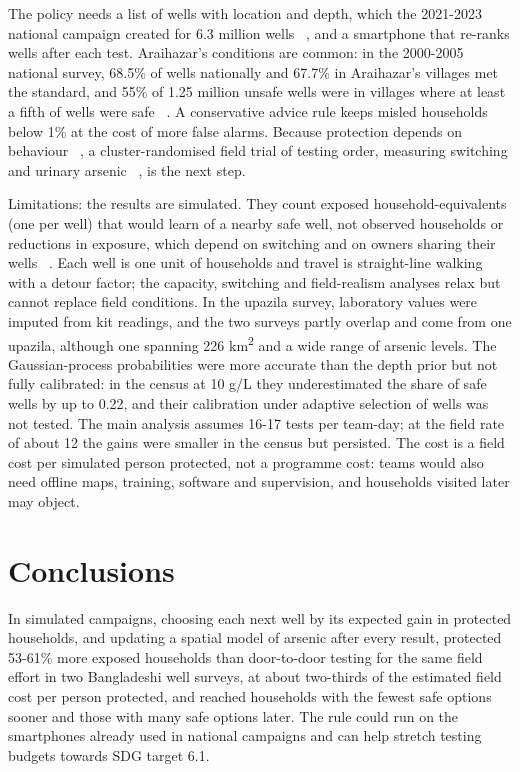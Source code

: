 \documentclass[sustainability,article,submit,pdftex,moreauthors]{Definitions/mdpi}
\begin{document}
The policy needs a list of wells with location and depth, which the 2021-2023 national campaign created for 6.3 million wells ~\cite{Khan2025}, and a smartphone that re-ranks wells after each test. Araihazar's conditions are common: in the 2000-2005 national survey, 68.5\% of wells nationally and 67.7\% in Araihazar's villages met the standard, and 55\% of 1.25 million unsafe wells were in villages where at least a fifth of wells were safe ~\cite{Jamil2019}. A conservative advice rule keeps misled households below 1\% at the cost of more false alarms. Because protection depends on behaviour ~\cite{Opar2007,Madajewicz2007,Pfaff2017}, a cluster-randomised field trial of testing order, measuring switching and urinary arsenic ~\cite{Chen2007}, is the next step.

Limitations: the results are simulated. They count exposed household-equivalents (one per well) that would learn of a nearby safe well, not observed households or reductions in exposure, which depend on switching and on owners sharing their wells ~\cite{Opar2007,Madajewicz2007}. Each well is one unit of households and travel is straight-line walking with a detour factor; the capacity, switching and field-realism analyses relax but cannot replace field conditions. In the upazila survey, laboratory values were imputed from kit readings, and the two surveys partly overlap and come from one upazila, although one spanning 226 km\textsuperscript{2} and a wide range of arsenic levels. The Gaussian-process probabilities were more accurate than the depth prior but not fully calibrated: in the census at 10 \textmu{}g/L they underestimated the share of safe wells by up to 0.22, and their calibration under adaptive selection of wells was not tested. The main analysis assumes 16-17 tests per team-day; at the field rate of about 12 the gains were smaller in the census but persisted. The cost is a field cost per simulated person protected, not a programme cost: teams would also need offline maps, training, software and supervision, and households visited later may object.

\section{Conclusions}

In simulated campaigns, choosing each next well by its expected gain in protected households, and updating a spatial model of arsenic after every result, protected 53-61\% more exposed households than door-to-door testing for the same field effort in two Bangladeshi well surveys, at about two-thirds of the estimated field cost per person protected, and reached households with the fewest safe options sooner and those with many safe options later. The rule could run on the smartphones already used in national campaigns and can help stretch testing budgets towards SDG target 6.1.
\end{document}
